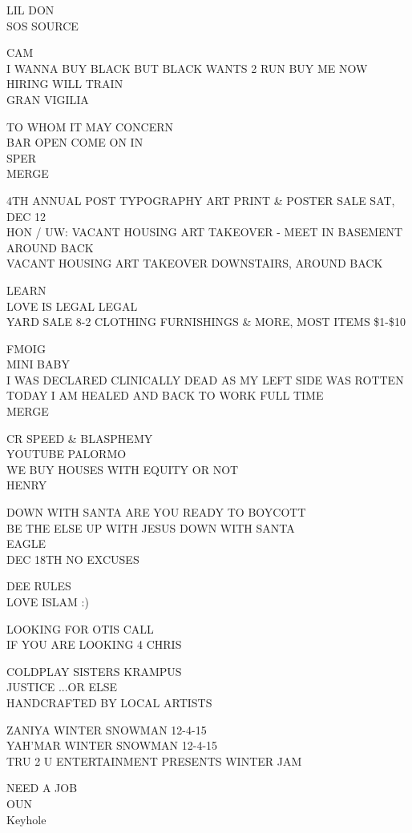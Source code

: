 \documentclass[10pt,letterpaper]{article}
\begin{document}
LIL DON\\
SOS SOURCE

CAM\\
I WANNA BUY BLACK BUT BLACK WANTS 2 RUN BUY ME NOW HIRING WILL TRAIN\\
GRAN VIGILIA

TO WHOM IT MAY CONCERN\\
BAR OPEN COME ON IN\\
SPER\\
MERGE

4TH ANNUAL POST TYPOGRAPHY ART PRINT \& POSTER SALE SAT, DEC 12\\
HON / UW: VACANT HOUSING ART TAKEOVER {-} MEET IN BASEMENT AROUND BACK\\
VACANT HOUSING ART TAKEOVER DOWNSTAIRS, AROUND BACK

LEARN\\
LOVE IS LEGAL LEGAL\\
YARD SALE 8{-}2 CLOTHING FURNISHINGS \& MORE, MOST ITEMS \$1{-}\$10

FMOIG\\
MINI BABY\\
I WAS DECLARED CLINICALLY DEAD AS MY LEFT SIDE WAS ROTTEN TODAY I AM HEALED AND BACK TO WORK FULL TIME\\
MERGE

CR SPEED \& BLASPHEMY\\
YOUTUBE PALORMO\\
WE BUY HOUSES WITH EQUITY OR NOT\\
HENRY

DOWN WITH SANTA ARE YOU READY TO BOYCOTT\\
BE THE ELSE UP WITH JESUS DOWN WITH SANTA\\
EAGLE\\
DEC 18TH NO EXCUSES

DEE RULES\\
LOVE ISLAM :)

LOOKING FOR OTIS CALL\\
IF YOU ARE LOOKING 4 CHRIS

COLDPLAY SISTERS KRAMPUS\\
JUSTICE ...OR ELSE\\
HANDCRAFTED BY LOCAL ARTISTS

ZANIYA WINTER SNOWMAN 12{-}4{-}15\\
YAH'MAR WINTER SNOWMAN 12{-}4{-}15\\
TRU 2 U ENTERTAINMENT PRESENTS WINTER JAM

NEED A JOB\\
OUN\\
Keyhole
\end{document}
